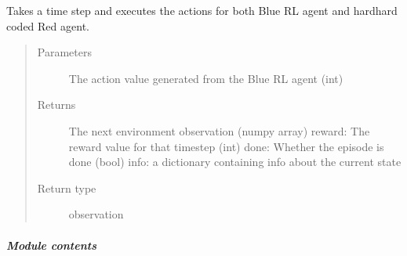 \documentclass[letterpaper,10pt,english]{sphinxmanual}
\begin{document}
\begin{fulllineitems}
\begin{fulllineitems}
\begin{quote}
\begin{description}
\end{description}\end{quote}

\end{fulllineitems}


\begin{fulllineitems}
\label{\detokenize{source/yawning_titan.envs.generic:yawning_titan.envs.generic.generic_env.GenericNetworkEnv.step}}
\sphinxAtStartPar
Takes a time step and executes the actions for both Blue RL agent and
hard\sphinxhyphen{}hard coded Red agent.
\begin{quote}\begin{description}
\item[{Parameters}] \leavevmode
\sphinxAtStartPar
{} \textendash{} The action value generated from the Blue RL agent (int)

\item[{Returns}] \leavevmode
\sphinxAtStartPar
The next environment observation (numpy array)
reward: The reward value for that timestep (int)
done: Whether the episode is done (bool)
info: a dictionary containing info about the current state

\item[{Return type}] \leavevmode
\sphinxAtStartPar
observation

\end{description}\end{quote}

\end{fulllineitems}


\end{fulllineitems}



\subparagraph{Module contents}
\label{\detokenize{source/yawning_titan.envs.generic:module-yawning_titan.envs.generic}}\label{\detokenize{source/yawning_titan.envs.generic:module-contents}}
\end{document}

